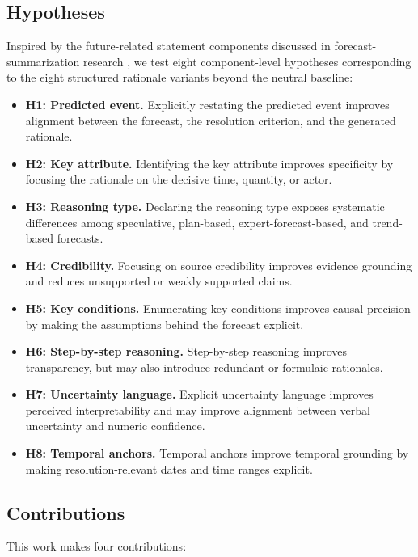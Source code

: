 \documentclass[11pt]{article}
\begin{document}
\subsection{Hypotheses}

Inspired by the future-related statement components discussed in forecast-summarization research \cite{saha2025wisdom}, we test eight component-level hypotheses corresponding to the eight structured rationale variants beyond the neutral baseline:

\begin{itemize}
    \item \textbf{H1: Predicted event.} Explicitly restating the predicted event improves alignment between the forecast, the resolution criterion, and the generated rationale.
    \item \textbf{H2: Key attribute.} Identifying the key attribute improves specificity by focusing the rationale on the decisive time, quantity, or actor.
    \item \textbf{H3: Reasoning type.} Declaring the reasoning type exposes systematic differences among speculative, plan-based, expert-forecast-based, and trend-based forecasts.
    \item \textbf{H4: Credibility.} Focusing on source credibility improves evidence grounding and reduces unsupported or weakly supported claims.
    \item \textbf{H5: Key conditions.} Enumerating key conditions improves causal precision by making the assumptions behind the forecast explicit.
    \item \textbf{H6: Step-by-step reasoning.} Step-by-step reasoning improves transparency, but may also introduce redundant or formulaic rationales.
    \item \textbf{H7: Uncertainty language.} Explicit uncertainty language improves perceived interpretability and may improve alignment between verbal uncertainty and numeric confidence.
    \item \textbf{H8: Temporal anchors.} Temporal anchors improve temporal grounding by making resolution-relevant dates and time ranges explicit.
\end{itemize}

\subsection{Contributions}

This work makes four contributions:
\end{document}
